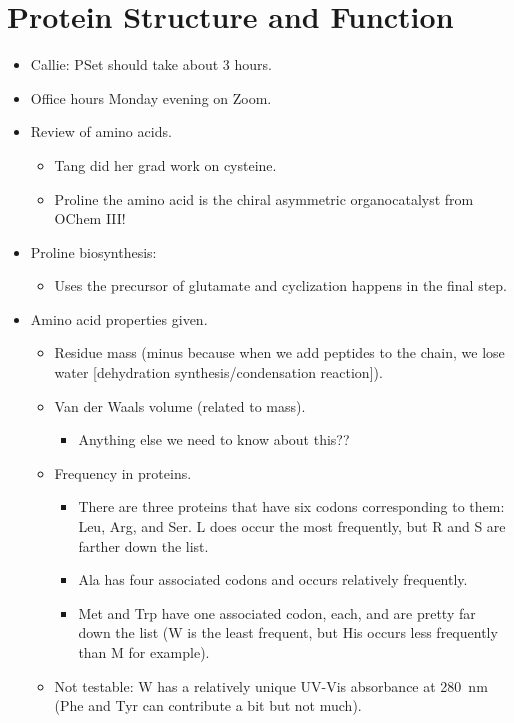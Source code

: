 \documentclass[../notes.tex]{subfiles}
\begin{document}
\section{Protein Structure and Function}
\begin{itemize}
    \item {}Callie: PSet should take about 3 hours.
    \item Office hours Monday evening on Zoom.
    \item Review of amino acids.
    \begin{itemize}
        \item Tang did her grad work on cysteine.
        \item Proline the amino acid is the chiral asymmetric organocatalyst from OChem III!
    \end{itemize}
    \item Proline biosynthesis:
    \begin{itemize}
        \item Uses the precursor of glutamate and cyclization happens in the final step.
    \end{itemize}
    \item Amino acid properties given.
    \begin{itemize}
        \item Residue mass (minus  because when we add peptides to the chain, we lose water [dehydration synthesis/condensation reaction]).
        \item Van der Waals volume (related to mass).
        \begin{itemize}
            \item Anything else we need to know about this??
        \end{itemize}
        \item Frequency in proteins.
        \begin{itemize}
            \item There are three proteins that have six codons corresponding to them: Leu, Arg, and Ser. L does occur the most frequently, but R and S are farther down the list.
            \item Ala has four associated codons and occurs relatively frequently.
            \item Met and Trp have one associated codon, each, and are pretty far down the list (W is the least frequent, but His occurs less frequently than M for example).
        \end{itemize}
        \item Not testable: W has a relatively unique UV-Vis absorbance at \SI{280}{\nano\meter} (Phe and Tyr can contribute a bit but not much).

\end{itemize}
\end{itemize}
\end{document}
